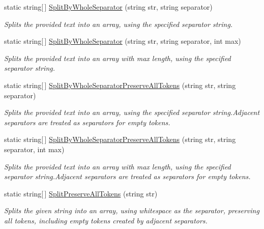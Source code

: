 \begin{DoxyCompactItemize}
static string\mbox{[}$\,$\mbox{]} \hyperlink{class_ultimate_1_1_utilities_1_1_string_utils_a2d3a404a47684ff8587cb499f9ea1175}{Split\+By\+Whole\+Separator} (string str, string separator)
\begin{DoxyCompactList}\small\item\em Splits the provided text into an array, using the specified separator string. \end{DoxyCompactList}\item 
static string\mbox{[}$\,$\mbox{]} \hyperlink{class_ultimate_1_1_utilities_1_1_string_utils_a736c5869a08406dcf5b40c5cd35f6dbd}{Split\+By\+Whole\+Separator} (string str, string separator, int max)
\begin{DoxyCompactList}\small\item\em Splits the provided text into an array with max length, using the specified separator string. \end{DoxyCompactList}\item 
static string\mbox{[}$\,$\mbox{]} \hyperlink{class_ultimate_1_1_utilities_1_1_string_utils_a0fdc637fcab1b7c5ce9e68ec21617835}{Split\+By\+Whole\+Separator\+Preserve\+All\+Tokens} (string str, string separator)
\begin{DoxyCompactList}\small\item\em Splits the provided text into an array, using the specified separator string.\+Adjacent separators are treated as separators for empty tokens. \end{DoxyCompactList}\item 
static string\mbox{[}$\,$\mbox{]} \hyperlink{class_ultimate_1_1_utilities_1_1_string_utils_aceff235a57afd310662c6fc98b478f5f}{Split\+By\+Whole\+Separator\+Preserve\+All\+Tokens} (string str, string separator, int max)
\begin{DoxyCompactList}\small\item\em Splits the provided text into an array with max length, using the specified separator string.\+Adjacent separators are treated as separators for empty tokens. \end{DoxyCompactList}\item 
static string\mbox{[}$\,$\mbox{]} \hyperlink{class_ultimate_1_1_utilities_1_1_string_utils_a64a975f2729d81bf8a31b1138db0443e}{Split\+Preserve\+All\+Tokens} (string str)
\begin{DoxyCompactList}\small\item\em Splits the given string into an array, using whitespace as the separator, preserving all tokens, including empty tokens created by adjacent separators. \end{DoxyCompactList}\item 

\end{DoxyCompactItemize}
